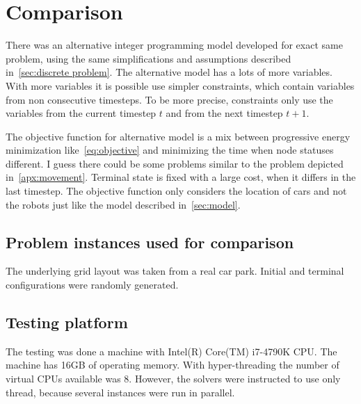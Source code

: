 \section{Comparison}
There was an alternative integer programming model developed for exact same
problem, using the same simplifications and assumptions described
in~\autoref{sec:discrete problem}. The alternative model has a lots of more
variables. With more variables it is possible use simpler constraints, which
contain variables from non consecutive timesteps. To be more precise,
constraints only use the variables from the current timestep $t$ and from the
next timestep $t+1$.

The objective function for alternative model is a mix between progressive
energy minimization like~\eqref{eq:objective} and minimizing the time when node
statuses different. I guess there could be some problems similar to the problem
depicted in~\autoref{apx:movement}. Terminal state is fixed with a large cost,
when it differs in the last timestep. The objective function only considers the
location of cars and not the robots just like the model described
in~\autoref{sec:model}.

\subsection{Problem instances used for comparison}
The underlying grid layout was taken from a real car park. Initial and terminal
configurations were randomly generated.

\subsection{Testing platform}
The testing was done a machine with Intel(R) Core(TM) i7-4790K CPU.  The
machine has 16GB of operating memory. With hyper-threading the number of
virtual CPUs available was 8. However, the solvers were instructed to use only
thread, because several instances were run in parallel.

